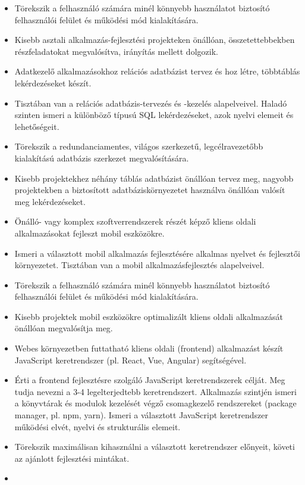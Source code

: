 \begin{itemize}
\item
  Törekszik a felhasználó számára minél könnyebb használatot biztosító
  felhasználói felület és működési mód kialakítására.
\item
  Kisebb asztali alkalmazás-fejlesztési projekteken önállóan,
  összetettebbekben részfeladatokat megvalósítva, irányítás mellett
  dolgozik.
\item
  Adatkezelő alkalmazásokhoz relációs adatbázist tervez és hoz létre,
  többtáblás lekérdezéseket készít.
\item
  Tisztában van a relációs adatbázis-tervezés és -kezelés alapelveivel.
  Haladó szinten ismeri a különböző típusú SQL lekérdezéseket, azok
  nyelvi elemeit és lehetőségeit.
\item
  Törekszik a redundanciamentes, világos szerkezetű, legcélravezetőbb
  kialakítású adatbázis szerkezet megvalósítására.
\item
  Kisebb projektekhez néhány táblás adatbázist önállóan tervez meg,
  nagyobb projektekben a biztosított adatbáziskörnyezetet használva
  önállóan valósít meg lekérdezéseket.
\item
  Önálló- vagy komplex szoftverrendszerek részét képző kliens oldali
  alkalmazásokat fejleszt mobil eszközökre.
\item
  Ismeri a választott mobil alkalmazás fejlesztésére alkalmas nyelvet és
  fejlesztői környezetet. Tisztában van a mobil alkalmazásfejlesztés
  alapelveivel.
\item
  Törekszik a felhasználó számára minél könnyebb használatot biztosító
  felhasználói felület és működési mód kialakítására.
\item
  Kisebb projektek mobil eszközökre optimalizált kliens oldali
  alkalmazását önállóan megvalósítja meg.
\item
  Webes környezetben futtatható kliens oldali (frontend) alkalmazást
  készít JavaScript keretrendszer (pl. React, Vue, Angular)
  segítségével.
\item
  Érti a frontend fejlesztésre szolgáló JavaScript keretrendszerek
  célját. Meg tudja nevezni a 3-4 legelterjedtebb keretrendszert.
  Alkalmazás szintjén ismeri a könyvtárak és modulok kezelését végző
  csomagkezelő rendszereket (package manager, pl. npm, yarn). Ismeri a
  választott JavaScript keretrendszer működési elvét, nyelvi és
  strukturális elemeit.
\item
  Törekszik maximálisan kihasználni a választott keretrendszer előnyeit,
  követi az ajánlott fejlesztési mintákat.
\item

\end{itemize}
